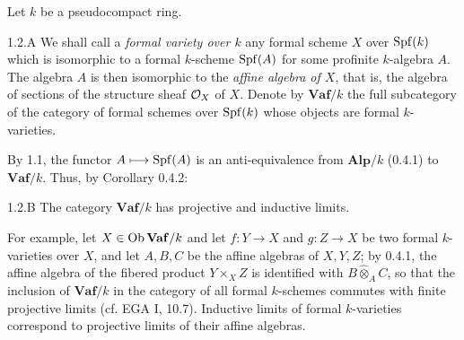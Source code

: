 Let $k$ be a pseudocompact ring.
\begin{definition}{1.2.A}\label{VIIB.1.2.A}
We shall call a \emph{formal variety over $k$} any formal scheme $X$ over $\operatorname{Spf}(k)$ which is isomorphic to a formal $k$-scheme $\operatorname{Spf}(A)$ for some profinite $k$-algebra $A$. The algebra $A$ is then isomorphic to the \emph{affine algebra of $X$}, that is, the algebra of sections of the structure sheaf $\mathcal{O}_X$ of $X$.
Denote by $\mathbf{Vaf}/k$ the full subcategory of the category of formal schemes over $\operatorname{Spf}(k)$ whose objects are formal $k$-varieties.
\end{definition}
By 1.1, the functor $A\longmapsto\operatorname{Spf}(A)$ is an anti-equivalence from $\mathbf{Alp}/k$ (0.4.1) to $\mathbf{Vaf}/k$. Thus, by Corollary 0.4.2:
\begin{proposition}{1.2.B}\label{VIIB.1.2.B}
The category $\mathbf{Vaf}/k$ has projective and inductive limits.
\end{proposition}
For example, let $X\in\operatorname{Ob}\mathbf{Vaf}/k$ and let $f:Y\to X$ and $g:Z\to X$ be two formal $k$-varieties over $X$, and let $A,B,C$ be the affine algebras of $X,Y,Z$; by 0.4.1, the affine algebra of the fibered product $Y\times_X Z$ is identified with $B\widehat\otimes_A C$, so that the inclusion of $\mathbf{Vaf}/k$ in the category of all formal $k$-schemes commutes with finite projective limits (cf. EGA I, 10.7).
Inductive limits of formal $k$-varieties correspond to projective limits of their affine algebras.

